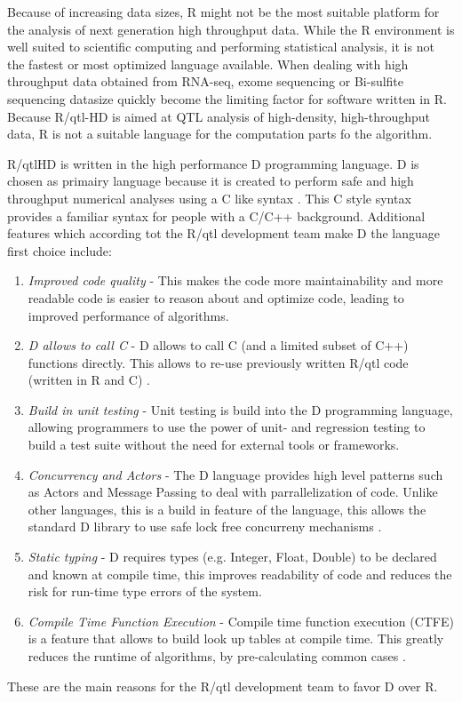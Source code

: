 Because of increasing data sizes, R might not be the most suitable platform for the analysis 
of next generation high throughput data. While the R environment is well suited to scientific 
computing and performing statistical analysis, it is not the fastest or most optimized 
language available. When dealing with high throughput data obtained from RNA-seq, exome sequencing 
or Bi-sulfite sequencing datasize quickly become the limiting factor for software written in R. 
Because R/qtl-HD is aimed at QTL analysis of high-density, high-throughput data, R is not a suitable 
language for the computation parts fo the algorithm.

R/qtlHD is written in the high performance D programming language. D is chosen as primairy language 
because it is created to perform safe and high throughput numerical analyses using a C like syntax \cite{Alexandrescu:2011}. 
This C style syntax provides a familiar syntax for people with a C/C++ background. Additional features which according 
tot the R/qtl development team make D the language first choice include:
\begin{enumerate}\itemsep1pt
\item \emph{Improved code quality} - This makes the code more maintainability and more readable code is 
easier to reason about and optimize code, leading to improved performance of algorithms.
\item \emph{D allows to call C} - D allows to call C (and a limited subset of C++) functions directly. This 
allows to re-use previously written R/qtl code (written in R and C) \cite{RQTLGuide:2009}.
\item \emph{Build in unit testing} - Unit testing is build into the D programming language, allowing 
programmers to use the power of unit- and regression testing to build a test suite without the need 
for external tools or frameworks.
\item \emph{Concurrency and Actors} - The D language provides high level patterns such as Actors and 
Message Passing to deal with parrallelization of code. Unlike other languages, this is a build in 
feature of the language, this allows the standard D library to use safe lock free concurreny mechanisms \cite{Alexandrescu:2011}.
\item \emph{Static typing} - D requires types (e.g. Integer, Float, Double) to be declared and known 
at compile time, this improves readability of code and reduces the risk for run-time type errors of the system.
\item \emph{Compile Time Function Execution} - Compile time function execution (CTFE) is a feature 
that allows to build look up tables at compile time. This greatly reduces the runtime of algorithms, 
by pre-calculating common cases \cite{ArendsBlog:2012}.
\end{enumerate}
These are the main reasons for the R/qtl development team to favor D over R.

